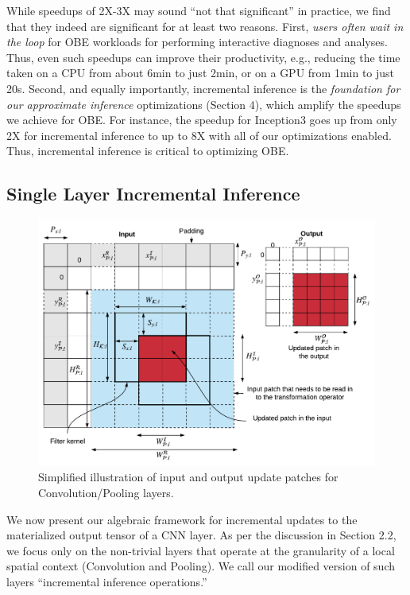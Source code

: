 While speedups of 2X-3X may sound ``not that significant'' in practice, we find that they indeed are significant for at least two reasons. First, \textit{users often wait in the loop} for OBE workloads for performing interactive diagnoses and analyses. Thus, even such speedups can improve their productivity, e.g., reducing the time taken on a CPU from about 6min to just 2min, or on a GPU from 1min to just 20s. Second, and equally importantly, incremental inference is the \textit{foundation for our approximate inference} optimizations (Section 4), which amplify the speedups we achieve for OBE. For instance, the speedup for Inception3 goes up from only 2X for incremental inference to up to 8X with all of our optimizations enabled. Thus, incremental inference is critical to optimizing OBE.

\subsection{Single Layer Incremental Inference}\label{sec:inc_computation}

\begin{figure}[t]
\includegraphics[width=\columnwidth]{images/dimensions}
\vspace{-8mm}
\caption{Simplified illustration of input and output update patches for Convolution/Pooling layers.}
\label{fig:dimensions}
\vspace{-4mm}
\end{figure}

We now present our algebraic framework for incremental updates to the materialized output tensor of a CNN layer. As per the discussion in Section 2.2, we focus only on the non-trivial layers that operate at the granularity of a local spatial context (Convolution and Pooling). We call our modified version of such layers ``incremental inference operations.''

